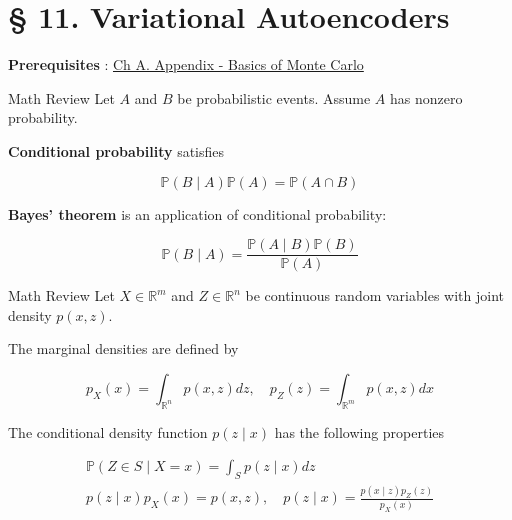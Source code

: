 \section{§ 11. Variational Autoencoders}


\begin{frame}[allowframebreaks]

\textbf{Prerequisites} : \href{./13.md}{Ch A. Appendix - Basics of Monte Carlo}

\end{frame}

\begin{frame}[allowframebreaks]

\begin{myconceptblock}{11.1}{Math Review}
    Let $A$ and $B$ be probabilistic events. Assume $A$ has nonzero probability.

    \textbf{Conditional probability} satisfies

    $$
    \mathbb{P}(B \mid A) \mathbb{P}(A)=\mathbb{P}(A \cap B)
    $$

    \textbf{Bayes' theorem} is an application of conditional probability:

    $$
    \mathbb{P}(B \mid A)=\frac{\mathbb{P}(A \mid B) \mathbb{P}(B)}{\mathbb{P}(A)}
    $$
\end{myconceptblock}

\end{frame}

\begin{frame}[allowframebreaks]

\begin{myconceptblock}{11.2}{Math Review}
    Let $X \in \mathbb{R}^{m}$ and $Z \in \mathbb{R}^{n}$ be continuous random variables with joint density $p(x, z)$.

    The marginal densities are defined by

    $$
    p_{X}(x)=\int_{\mathbb{R}^{n}} p(x, z) d z, \quad p_{Z}(z)=\int_{\mathbb{R}^{m}} p(x, z) d x
    $$

    The conditional density function $p(z \mid x)$ has the following properties

    $$
    \begin{gathered}
    \mathbb{P}(Z \in S \mid X=x)=\int_{S} p(z \mid x) d z \\
    p(z \mid x) p_{X}(x)=p(x, z), \quad p(z \mid x)=\frac{p(x \mid z) p_{Z}(z)}{p_{X}(x)}
    \end{gathered}
    $$
\end{myconceptblock}

\end{frame}

